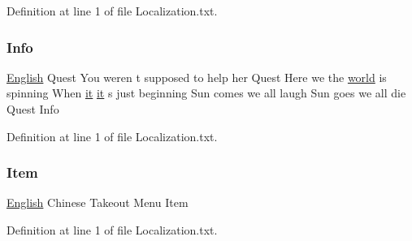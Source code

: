 Definition at line 1 of file Localization.\+txt.

\mbox{\label{_dishong_01_tower_01_challenge_2_config_2_localization_8txt_abb68e52d696d925afb927a05387d9ea2}} 
\subsubsection{\texorpdfstring{Info}{Info}}
{\footnotesize\ttfamily \mbox{\hyperlink{_sphere_i_i_01_winter_01_project_2_config_2_localization_8txt_ad896b63205779b1b09e86d941ce13976}{English}} Quest You weren t supposed to help her Quest Here we the \mbox{\hyperlink{_sphere_i_i_01_music_01_boxes_2_config_2_localization_8txt_a7ede01351426b1b7f6c1ce5f794e474f}{world}} is spinning When \mbox{\hyperlink{_the_01_restless_01_curse_2_config_2_localization_01-_01_quest_8txt_a741b285909bea4855b886664c2dcd50c}{it}} \mbox{\hyperlink{_the_01_restless_01_curse_2_config_2_localization_01-_01_quest_8txt_a741b285909bea4855b886664c2dcd50c}{it}} s just beginning Sun comes we all laugh Sun goes we all die Quest Info}



Definition at line 1 of file Localization.\+txt.

\mbox{\label{_dishong_01_tower_01_challenge_2_config_2_localization_8txt_ad20ef489e72c75650a4330cf262851b5}} 
\subsubsection{\texorpdfstring{Item}{Item}}
{\footnotesize\ttfamily \mbox{\hyperlink{_sphere_i_i_01_winter_01_project_2_config_2_localization_8txt_ad896b63205779b1b09e86d941ce13976}{English}} Chinese Takeout Menu Item}



Definition at line 1 of file Localization.\+txt.

\mbox{\label{_dishong_01_tower_01_challenge_2_config_2_localization_8txt_ac9f63106d69e66a57567394d6c03cba2}} 
